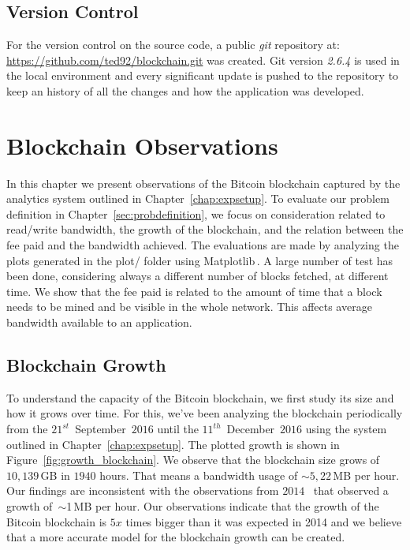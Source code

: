 \documentclass[USenglish]{uit-thesis}
\begin{document}
\section{Version Control}
\label{sec:versioncontrol}
For the version control on the source code, a public \emph{git} repository at:
\url{https://github.com/ted92/blockchain.git} was created. Git version \emph{2.6.4}
is used in the local environment and every significant update is pushed to the
repository to keep an history of all the changes and how the application was
developed.

\chapter{Blockchain Observations}
\label{chap:evaluation}
In this chapter we present observations of the Bitcoin blockchain captured by the
analytics system outlined in Chapter~\ref{chap:expsetup}. 
To evaluate our problem definition in Chapter~\ref{sec:probdefinition}, we focus on consideration related to 
read/write bandwidth, the growth of the blockchain, and the relation between the fee paid and the bandwidth achieved.
The evaluations are made by analyzing the plots generated in the plot/
folder using Matplotlib\,\cite{matplotlib}. A large number of test has been
done, considering always a different number of blocks fetched, at different time.
We show that the fee paid is related to the amount of time that a block needs to be mined and be visible in the whole network.
This affects average bandwidth available to an application.

\section{Blockchain Growth}
\label{sec:blockchain_growth}
To understand the capacity of the Bitcoin blockchain, we first study
its size and how it grows over time. For this, we've been analyzing the blockchain
periodically from the $21^{st}$~September~$2016$ until the $11^{th}$~December~$2016$
using the system outlined in Chapter~\ref{chap:expsetup}. The plotted growth is
shown in Figure~\ref{fig:growth_blockchain}. We observe that the blockchain size grows
of $10,139$\,GB in $1940$ hours. That means a bandwidth usage of $\sim5,22$\,MB per hour. 
Our findings are inconsistent with the observations from
$2014$~\cite{ethereum_white_paper} that observed a growth
of~$\sim$1\,MB per hour. Our observations indicate that the growth of the
Bitcoin blockchain is $5x$ times bigger than it was expected in 2014 and we
believe that a more accurate model for the blockchain growth can be created.
\end{document}
